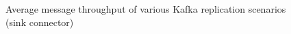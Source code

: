 \begin{figure}[htbp]
{    }
    \hfill
    \centering
    \hfill
    \caption{Average message throughput of various Kafka replication scenarios (sink connector)}
    \label{fig:appendix02:results:sinkmessages}
\end{figure}
